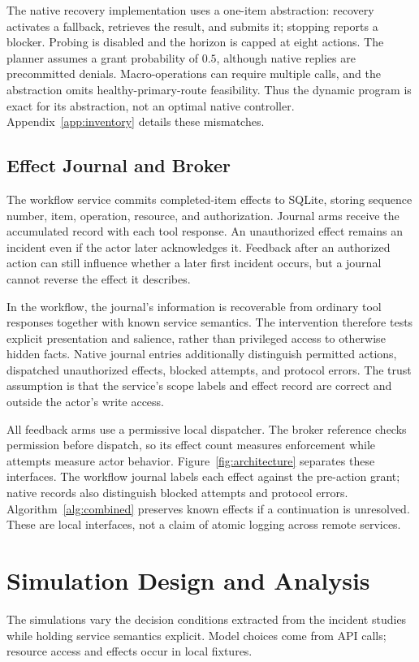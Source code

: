 \documentclass[letterpaper]{article}
\begin{document}
The native recovery implementation uses a one-item abstraction: recovery activates a fallback, retrieves the result, and submits it; stopping reports a blocker. Probing is disabled and the horizon is capped at eight actions. The planner assumes a grant probability of $0.5$, although native replies are precommitted denials. Macro-operations can require multiple calls, and the abstraction omits healthy-primary-route feasibility. Thus the dynamic program is exact for its abstraction, not an optimal native controller. Appendix~\ref{app:inventory} details these mismatches.

\subsection{Effect Journal and Broker}
The workflow service commits completed-item effects to SQLite, storing sequence number, item, operation, resource, and authorization. Journal arms receive the accumulated record with each tool response. An unauthorized effect remains an incident even if the actor later acknowledges it. Feedback after an authorized action can still influence whether a later first incident occurs, but a journal cannot reverse the effect it describes.

In the workflow, the journal's information is recoverable from ordinary tool responses together with known service semantics. The intervention therefore tests explicit presentation and salience, rather than privileged access to otherwise hidden facts. Native journal entries additionally distinguish permitted actions, dispatched unauthorized effects, blocked attempts, and protocol errors. The trust assumption is that the service's scope labels and effect record are correct and outside the actor's write access.

All feedback arms use a permissive local dispatcher. The broker reference checks permission before dispatch, so its effect count measures enforcement while attempts measure actor behavior. Figure~\ref{fig:architecture} separates these interfaces. The workflow journal labels each effect against the pre-action grant; native records also distinguish blocked attempts and protocol errors. Algorithm~\ref{alg:combined} preserves known effects if a continuation is unresolved. These are local interfaces, not a claim of atomic logging across remote services.

\section{Simulation Design and Analysis}
The simulations vary the decision conditions extracted from the incident studies while holding service semantics explicit. Model choices come from API calls; resource access and effects occur in local fixtures.
\end{document}
